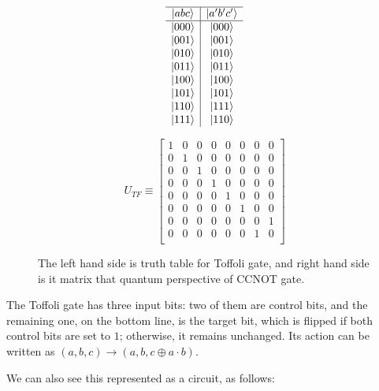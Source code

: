 \begin{figure}[h]
\centering
\begin{minipage}{0.45\textwidth}
\centering
\begin{displaymath}
\begin{array}{c|c}
\hline
{\ket{abc}} & {\ket{a'b'c'}}\\
\hline
{\ket{000}} & {\ket{000}}  \\
{\ket{001}} & {\ket{001}}  \\
{\ket{010}} & {\ket{010}}  \\
{\ket{011}} & {\ket{011}}  \\
{\ket{100}} & {\ket{100}}  \\
{\ket{101}} & {\ket{101}}  \\
{\ket{110}} & {\ket{111}}  \\
{\ket{111}} & {\ket{110}}  \\
\end{array}
\end{displaymath}
\end{minipage}%
\hfill
\begin{minipage}{0.45\textwidth}
\centering
\[
U_{TF} \equiv 
\begin{bmatrix}
    1 & 0 & 0 & 0 & 0 & 0 & 0 & 0 \\ 
    0 & 1 & 0 & 0 & 0 & 0 & 0 & 0 \\
    0 & 0 & 1 & 0 & 0 & 0 & 0 & 0 \\
    0 & 0 & 0 & 1 & 0 & 0 & 0 & 0 \\
    0 & 0 & 0 & 0 & 1 & 0 & 0 & 0 \\ 
    0 & 0 & 0 & 0 & 0 & 1 & 0 & 0 \\
    0 & 0 & 0 & 0 & 0 & 0 & 0 & 1 \\
    0 & 0 & 0 & 0 & 0 & 0 & 1 & 0 \\
\end{bmatrix}
\]
\end{minipage}
\caption{The left hand side is truth table for Toffoli gate, and right hand side is it matrix that quantum perspective of CCNOT gate.}
\end{figure}

The Toffoli gate has three input bits: two of them are control bits, and the remaining one, on the bottom line, is the target bit, which is flipped if both control bits are set to $1$; otherwise, it remains unchanged. Its action can be written as $(a, b, c) \rightarrow (a, b, c \oplus a \cdot b)$.

We can also see this represented as a circuit, as follows:

